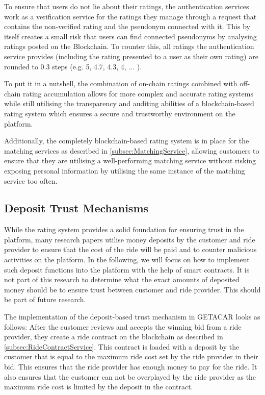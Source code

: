 To ensure that users do not lie about their ratings, the authentication services work as a verification service for the ratings they manage through a request that contains the non-verified rating and the pseudonym connected with it. This by itself creates a small risk that users can find connected pseudonyms by analysing ratings posted on the Blockchain. To counter this, all ratings the authentication service provides (including the rating presented to a user as their own rating) are rounded to 0.3 steps (e.g. 5, 4.7, 4.3, 4, ... ). 


To put it in a nutshell, the combination of on-chain ratings combined with off-chain rating accumulation allows for more complex and accurate rating systems while still utilising the transparency and auditing abilities of a blockchain-based rating system which ensures a secure and trustworthy environment on the platform.

Additionally, the completely blockchain-based rating system is in place for the matching services as described in \ref{subsec:MatchingService}, allowing customers to ensure that they are utilising a well-performing matching service without risking exposing personal information by utilising the same instance of the matching service too often.

\subsection{Deposit Trust Mechanisms}\label{subsec:DepositTrust}
While the rating system provides a solid foundation for ensuring trust in the platform, many research papers utilise money deposits by the customer and ride provider to ensure that the cost of the ride will be paid and to counter malicious activities on the platform. In the following, we will focus on how to implement such deposit functions into the platform with the help of smart contracts. It is not part of this research to determine what the exact amounts of deposited money should be to ensure trust between customer and ride provider. This should be part of future research.

The implementation of the deposit-based trust mechanism in GETACAR looks as follows:
After the customer reviews and accepts the winning bid from a ride provider, they create a ride contract on the blockchain as described in \ref{subsec:RideContractService}. This contract is loaded with a deposit by the customer that is equal to the maximum ride cost set by the ride provider in their bid. This ensures that the ride provider has enough money to pay for the ride. It also ensures that the customer can not be overplayed by the ride provider as the maximum ride cost is limited by the deposit in the contract. 

